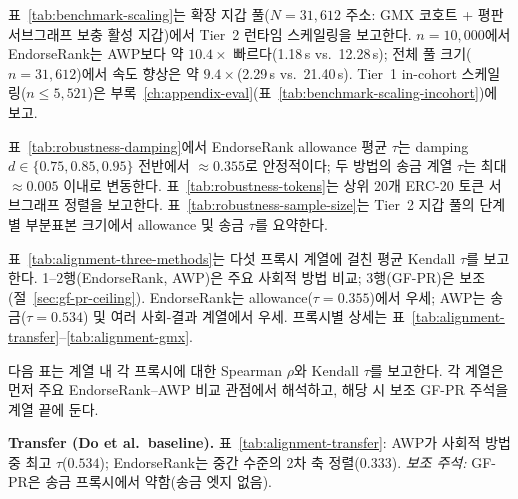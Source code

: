 

표~\ref{tab:benchmark-scaling}는 확장 지갑 풀($N=31{,}612$ 주소: GMX 코호트 + 평판 서브그래프 보충 활성 지갑)에서 Tier~2 런타임 스케일링을 보고한다. $n=10{,}000$에서 EndorseRank는 AWP보다 약 $10.4\times$ 빠르다(1.18\,s vs.\ 12.28\,s); 전체 풀 크기($n=31{,}612$)에서 속도 향상은 약 $9.4\times$(2.29\,s vs.\ 21.40\,s). Tier~1 in-cohort 스케일링($n \leq 5{,}521$)은 부록~\ref{ch:appendix-eval}(표~\ref{tab:benchmark-scaling-incohort})에 보고.




표~\ref{tab:robustness-damping}에서 EndorseRank allowance 평균 $\tau$는 damping $d \in \{0.75, 0.85, 0.95\}$ 전반에서 $\approx 0.355$로 안정적이다; 두 방법의 송금 계열 $\tau$는 최대 $\approx 0.005$ 이내로 변동한다. 표~\ref{tab:robustness-tokens}는 상위 20개 ERC-20 토큰 서브그래프 정렬을 보고한다. 표~\ref{tab:robustness-sample-size}는 Tier~2 지갑 풀의 단계별 부분표본 크기에서 allowance 및 송금 $\tau$를 요약한다.








표~\ref{tab:alignment-three-methods}는 다섯 프록시 계열에 걸친 평균 Kendall $\tau$를 보고한다. 1--2행(EndorseRank, AWP)은 주요 사회적 방법 비교; 3행(GF-PR)은 보조(절~\ref{sec:gf-pr-ceiling}). EndorseRank는 allowance($\tau=0.355$)에서 우세; AWP는 송금($\tau=0.534$) 및 여러 사회-결과 계열에서 우세. 프록시별 상세는 표~\ref{tab:alignment-transfer}--\ref{tab:alignment-gmx}.




다음 표는 계열 내 각 프록시에 대한 Spearman $\rho$와 Kendall $\tau$를 보고한다. 각 계열은 먼저 주요 EndorseRank--AWP 비교 관점에서 해석하고, 해당 시 보조 GF-PR 주석을 계열 끝에 둔다.

\textbf{Transfer (Do et al.\ baseline).} 표~\ref{tab:alignment-transfer}: AWP가 사회적 방법 중 최고 $\tau$($0.534$); EndorseRank는 중간 수준의 2차 축 정렬($0.333$). \emph{보조 주석:} GF-PR은 송금 프록시에서 약함(송금 엣지 없음).


